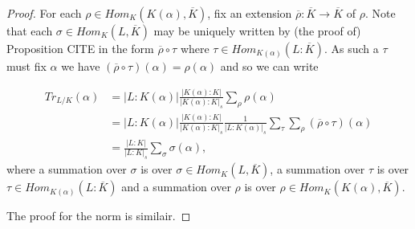 \documentclass[twoside, a4paper, 10pt]{amsart}
\begin{document}
\begin{proof} For each $\rho \in Hom_{K}(K(\alpha), \overline{K})$, fix an extension $\overline{\rho}:\overline{K} \to \overline{K}$ of $\rho$. Note that each $\sigma \in Hom_{K}(L, \overline{K})$ may be uniquely written by (the proof of) Proposition CITE in the form $\overline{\rho} \circ \tau$ where $\tau \in Hom_{K(\alpha)}(L : \overline{K})$. As such a $\tau$ must fix $\alpha$ we have $(\overline{\rho} \circ \tau) (\alpha) = \rho(\alpha)$ and so we can write 

\begin{align*}Tr_{L/K}(\alpha) &= |L:K(\alpha)| \frac{|K(\alpha):K|}{|K(\alpha):K|_s} \sum_{\rho} \rho(\alpha) \\ 
&= |L:K(\alpha)| \frac{|K(\alpha):K|}{|K(\alpha):K|_s} \frac{1}{|L:K(\alpha)|_s} \sum_{\tau} \sum_{\rho} (\overline{\rho} \circ \tau)(\alpha) \\
&= \frac{|L:K|}{|L:K|_s} \sum_{\sigma} \sigma(\alpha), \end{align*} where a summation over $\sigma$ is over $\sigma \in  Hom_{K}(L, \overline{K})$, a summation over $\tau$ is over $ \tau \in Hom_{K(\alpha)}(L : \overline{K})$ and a summation over $\rho$ is over  $\rho \in Hom_{K}(K(\alpha), \overline{K})$.

The proof for the norm is similair.\end{proof}
\end{document}

